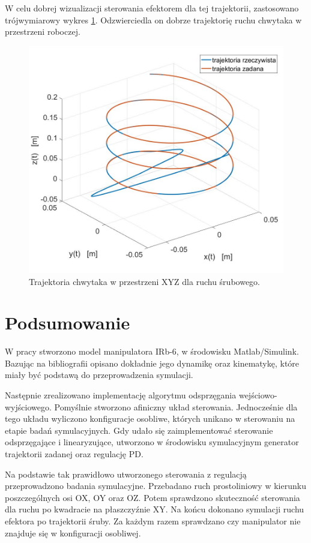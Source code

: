 \documentclass[eng,printmode]{mgr}
\begin{document}
W celu dobrej wizualizacji sterowania efektorem dla tej trajektorii, zastosowano trójwymiarowy wykres \ref{srubxyz}. Odzwierciedla on dobrze trajektorię ruchu chwytaka w przestrzeni roboczej. 
\begin{figure}[!h]
\centering
\includegraphics[width=1\textwidth]{srubxyzv2.jpg}
\caption{\label{srubxyz}Trajektoria chwytaka w przestrzeni XYZ dla ruchu śrubowego.}
\end{figure}
\chapter{Podsumowanie}
W pracy stworzono model manipulatora IRb-6, w środowisku Matlab/Simulink. Bazując na bibliografii opisano dokładnie jego dynamikę oraz kinematykę, które miały być podstawą do przeprowadzenia symulacji. 

Następnie zrealizowano implementację algorytmu odsprzęgania wejściowo-wyjściowego. Pomyślnie stworzono afiniczny układ sterowania. Jednocześnie dla tego układu wyliczono konfiguracje osobliwe, których unikano w sterowaniu na etapie badań symulacyjnych. Gdy udało się zaimplementować sterowanie odsprzęgające i linearyzujące, utworzono w środowisku symulacyjnym generator trajektorii zadanej oraz regulację PD. 

Na podstawie tak prawidłowo utworzonego sterowania z regulacją przeprowadzono badania symulacyjne. Przebadano ruch prostoliniowy w kierunku poszczególnych osi OX, OY oraz OZ. Potem sprawdzono skuteczność sterowania dla ruchu po kwadracie na płaszczyźnie XY. Na końcu dokonano symulacji ruchu efektora po trajektorii śruby. Za każdym razem sprawdzano czy manipulator nie znajduje się w konfiguracji osobliwej. 
\end{document}
